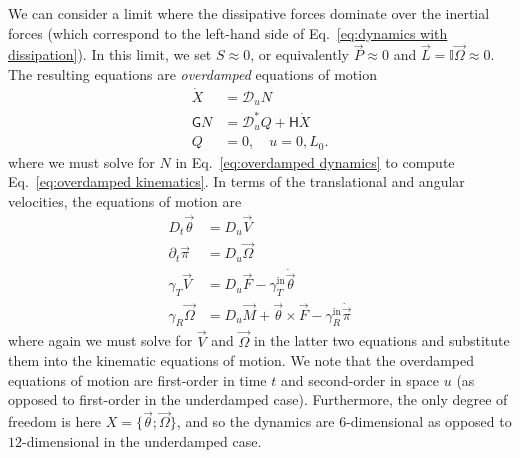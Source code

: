We can consider a limit where the dissipative forces dominate over the inertial forces (which correspond to the left-hand side of Eq.~\ref{eq:dynamics with dissipation}). In this limit, we set $S \approx 0$, or equivalently $\vec{P} \approx 0$ and $\vec{L} = \mathbb{I} \vec{\Omega} \approx 0$. The resulting equations are \textit{overdamped} equations of motion
\begin{subequations}  
\begin{align}
\dot{X} & = \mathcal{D}_u N \label{eq:overdamped kinematics} \\
\mathsf{G} N & = \mathcal{D}^*_u Q + \mathsf{H} \dot{X} \label{eq:overdamped dynamics} \\
Q & = 0, \quad u = 0, L_0.
\end{align}
\end{subequations}
where we must solve for $N$ in Eq.~\ref{eq:overdamped dynamics} to compute Eq.~\ref{eq:overdamped kinematics}. In terms of the translational and angular velocities, the equations of motion are
\begin{subequations} \label{eq:overdamped equations of motion in moving frame}
\begin{align}
D_t \vec{\theta} & = D_u \vec{V} \\
\partial_t \vec{\pi} & = D_u \vec{\Omega} \\
\gamma_T \vec{V} & = D_u \vec{F} - \gamma^\text{in}_T \dot{\vec{\theta}}  \\
\gamma_R \vec{\Omega} & = D_u \vec{M} + \vec{\theta} \times \vec{F}  - \gamma^\text{in}_R \dot{\vec{\pi}}
\end{align}
\end{subequations}
where again we must solve for $\vec{V}$ and $\vec{\Omega}$ in the latter two equations and substitute them into the kinematic equations of motion. We note that the overdamped equations of motion are first-order in time $t$ and second-order in space $u$ (as opposed to first-order in the underdamped case). Furthermore, the only degree of freedom is here $X = \{ \vec{\theta} ; \vec{\Omega} \}$, and so the dynamics are $6$-dimensional as opposed to $12$-dimensional in the underdamped case.

